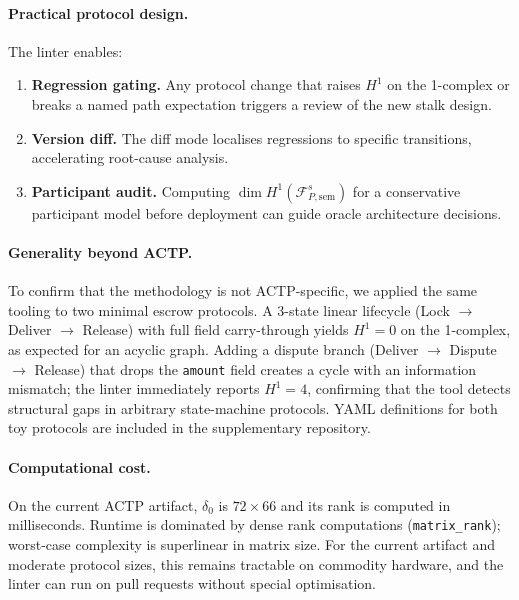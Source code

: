 \documentclass[11pt]{article}
\theoremstyle{plain}
\theoremstyle{definition}
\newcommand{\Fsh}{\mathcal{F}}         %
\newcommand{\Hone}{H^{1}}
\newcommand{\deltazero}{\delta_{0}}
\newcommand{\dimn}{\operatorname{dim}}
\begin{document}
\paragraph{Practical protocol design.}
The linter enables:
\begin{enumerate}
  \item \textbf{Regression gating.} Any protocol change that raises $\Hone$
        on the 1-complex or breaks a named path expectation triggers a review
        of the new stalk design.
  \item \textbf{Version diff.} The diff mode localises regressions to specific
        transitions, accelerating root-cause analysis.
  \item \textbf{Participant audit.} Computing $\dimn\Hone(\Fsh_{P,\mathrm{sem}}^s)$ for a
        conservative participant model before deployment can guide oracle
        architecture decisions.
\end{enumerate}

\paragraph{Generality beyond ACTP.}
To confirm that the methodology is not ACTP-specific, we applied the same
tooling to two minimal escrow protocols.  A 3-state linear lifecycle
(Lock $\to$ Deliver $\to$ Release) with full field carry-through yields
$\Hone = 0$ on the 1-complex, as expected for an acyclic graph.  Adding a
dispute branch (Deliver $\to$ Dispute $\to$ Release) that drops the
\texttt{amount} field creates a cycle with an information mismatch;
the linter immediately reports $\Hone = 4$, confirming that the tool detects
structural gaps in arbitrary state-machine protocols.  YAML definitions for
both toy protocols are included in the supplementary repository.

\paragraph{Computational cost.}
On the current ACTP artifact, $\deltazero$ is $72 \times 66$ and its rank is
computed in milliseconds.  Runtime is dominated by dense rank computations
(\texttt{matrix\_rank}); worst-case complexity is superlinear in matrix size.
For the current artifact and moderate protocol sizes, this remains tractable
on commodity hardware, and the linter can run on pull requests without
special optimisation.
\end{document}
